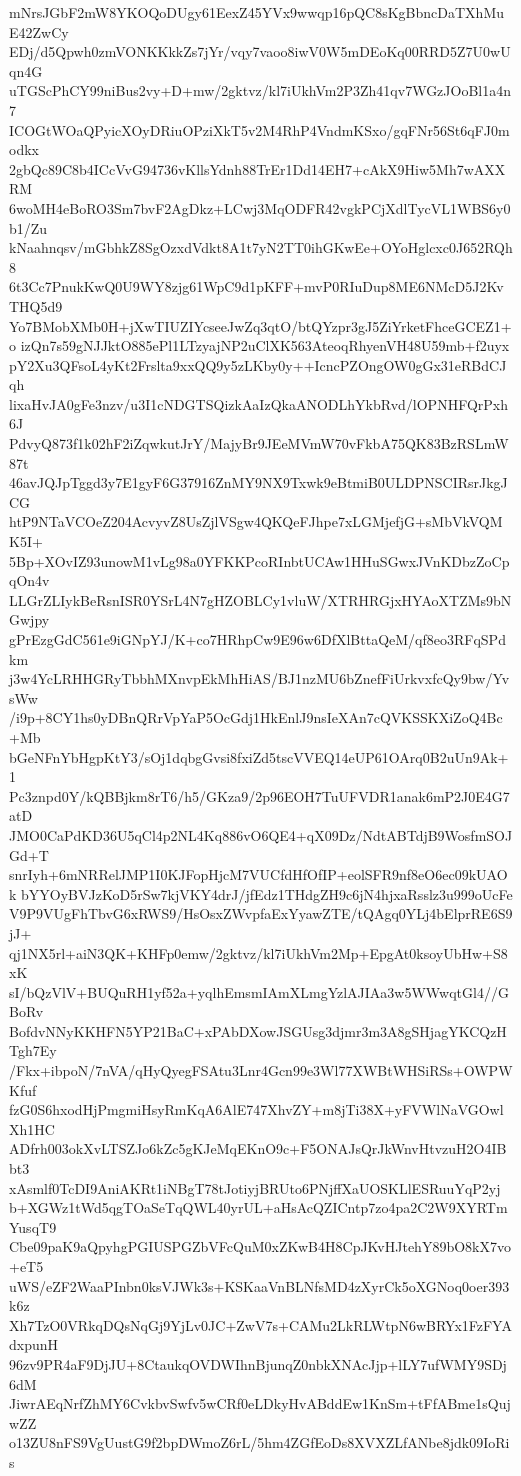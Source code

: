 mNrsJGbF2mW8YKOQoDUgy61EexZ45YVx9wwqp16pQC8sKgBbncDaTXhMuE42ZwCy
EDj/d5Qpwh0zmVONKKkkZs7jYr/vqy7vaoo8iwV0W5mDEoKq00RRD5Z7U0wUqn4G
uTGScPhCY99niBus2vy+D+mw/2gktvz/kl7iUkhVm2P3Zh41qv7WGzJOoBl1a4n7
ICOGtWOaQPyicXOyDRiuOPziXkT5v2M4RhP4VndmKSxo/gqFNr56St6qFJ0modkx
2gbQc89C8b4ICcVvG94736vKllsYdnh88TrEr1Dd14EH7+cAkX9Hiw5Mh7wAXXRM
6woMH4eBoRO3Sm7bvF2AgDkz+LCwj3MqODFR42vgkPCjXdlTycVL1WBS6y0b1/Zu
kNaahnqsv/mGbhkZ8SgOzxdVdkt8A1t7yN2TT0ihGKwEe+OYoHglcxc0J652RQh8
6t3Cc7PnukKwQ0U9WY8zjg61WpC9d1pKFF+mvP0RIuDup8ME6NMcD5J2KvTHQ5d9
Yo7BMobXMb0H+jXwTIUZIYcseeJwZq3qtO/btQYzpr3gJ5ZiYrketFhceGCEZ1+o
izQn7s59gNJJktO885ePl1LTzyajNP2uClXK563AteoqRhyenVH48U59mb+f2uyx
pY2Xu3QFsoL4yKt2Frslta9xxQQ9y5zLKby0y++IcncPZOngOW0gGx31eRBdCJqh
lixaHvJA0gFe3nzv/u3I1cNDGTSQizkAaIzQkaANODLhYkbRvd/lOPNHFQrPxh6J
PdvyQ873f1k02hF2iZqwkutJrY/MajyBr9JEeMVmW70vFkbA75QK83BzRSLmW87t
46avJQJpTggd3y7E1gyF6G37916ZnMY9NX9Txwk9eBtmiB0ULDPNSCIRsrJkgJCG
htP9NTaVCOeZ204AcvyvZ8UsZjlVSgw4QKQeFJhpe7xLGMjefjG+sMbVkVQMK5I+
5Bp+XOvIZ93unowM1vLg98a0YFKKPcoRInbtUCAw1HHuSGwxJVnKDbzZoCpqOn4v
LLGrZLIykBeRsnISR0YSrL4N7gHZOBLCy1vluW/XTRHRGjxHYAoXTZMs9bNGwjpy
gPrEzgGdC561e9iGNpYJ/K+co7HRhpCw9E96w6DfXlBttaQeM/qf8eo3RFqSPdkm
j3w4YcLRHHGRyTbbhMXnvpEkMhHiAS/BJ1nzMU6bZnefFiUrkvxfcQy9bw/YvsWw
/i9p+8CY1hs0yDBnQRrVpYaP5OcGdj1HkEnlJ9nsIeXAn7cQVKSSKXiZoQ4Bc+Mb
bGeNFnYbHgpKtY3/sOj1dqbgGvsi8fxiZd5tscVVEQ14eUP61OArq0B2uUn9Ak+1
Pc3znpd0Y/kQBBjkm8rT6/h5/GKza9/2p96EOH7TuUFVDR1anak6mP2J0E4G7atD
JMO0CaPdKD36U5qCl4p2NL4Kq886vO6QE4+qX09Dz/NdtABTdjB9WosfmSOJGd+T
snrIyh+6mNRRelJMP1I0KJFopHjcM7VUCfdHfOfIP+eolSFR9nf8eO6ec09kUAOk
bYYOyBVJzKoD5rSw7kjVKY4drJ/jfEdz1THdgZH9c6jN4hjxaRsslz3u999oUcFe
V9P9VUgFhTbvG6xRWS9/HsOsxZWvpfaExYyawZTE/tQAgq0YLj4bElprRE6S9jJ+
qj1NX5rl+aiN3QK+KHFp0emw/2gktvz/kl7iUkhVm2Mp+EpgAt0ksoyUbHw+S8xK
sI/bQzVlV+BUQuRH1yf52a+yqlhEmsmIAmXLmgYzlAJIAa3w5WWwqtGl4//GBoRv
BofdvNNyKKHFN5YP21BaC+xPAbDXowJSGUsg3djmr3m3A8gSHjagYKCQzHTgh7Ey
/Fkx+ibpoN/7nVA/qHyQyegFSAtu3Lnr4Gcn99e3Wl77XWBtWHSiRSs+OWPWKfuf
fzG0S6hxodHjPmgmiHsyRmKqA6AlE747XhvZY+m8jTi38X+yFVWlNaVGOwlXh1HC
ADfrh003okXvLTSZJo6kZc5gKJeMqEKnO9c+F5ONAJsQrJkWnvHtvzuH2O4IBbt3
xAsmlf0TcDI9AniAKRt1iNBgT78tJotiyjBRUto6PNjffXaUOSKLlESRuuYqP2yj
b+XGWz1tWd5qgTOaSeTqQWL40yrUL+aHsAcQZICntp7zo4pa2C2W9XYRTmYusqT9
Cbe09paK9aQpyhgPGIUSPGZbVFcQuM0xZKwB4H8CpJKvHJtehY89bO8kX7vo+eT5
uWS/eZF2WaaPInbn0ksVJWk3s+KSKaaVnBLNfsMD4zXyrCk5oXGNoq0oer393k6z
Xh7TzO0VRkqDQsNqGj9YjLv0JC+ZwV7s+CAMu2LkRLWtpN6wBRYx1FzFYAdxpunH
96zv9PR4aF9DjJU+8CtaukqOVDWIhnBjunqZ0nbkXNAcJjp+lLY7ufWMY9SDj6dM
JiwrAEqNrfZhMY6CvkbvSwfv5wCRf0eLDkyHvABddEw1KnSm+tFfABme1sQujwZZ
o13ZU8nFS9VgUustG9f2bpDWmoZ6rL/5hm4ZGfEoDs8XVXZLfANbe8jdk09IoRis
